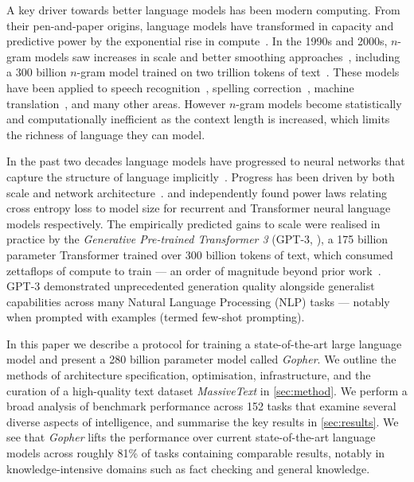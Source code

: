 \documentclass[11pt, a4paper, logo, internal, copyright, nonumbering]{deepmind}
\newcommand{\massivetext}{\textit{MassiveText}\xspace}
\newcommand{\gopher}{\textit{Gopher}\xspace}
\begin{document}
A key driver towards better language models has been modern computing. From their pen-and-paper origins, language models have transformed in capacity and predictive power by the exponential rise in compute~\citep{moore1965cramming}. In the 1990s and 2000s, $n$-gram models saw increases in scale and better smoothing approaches~\citep{ney1994structuring}, including a 300 billion $n$-gram model trained on two trillion tokens of text~\citep{brants2007large}.  These models have been applied to speech recognition~\citep{jelinek1997statistical}, spelling correction~\citep{brill2000improved}, machine translation~\citep{brown1990statistical}, and many other areas. However $n$-gram models become statistically and computationally inefficient as the context length is increased, which limits the richness of language they can model.

In the past two decades language models have progressed to neural networks that capture the structure of language implicitly~\citep{bengio2003neural, mikolov2010recurrent, graves2013generating, jozefowicz2016exploring, radford2019language}.
Progress has been driven by both scale and network architecture~\citep{hochreiter1997long,bahdanau2014neural,vaswani2017attention}.
\citet{rosenfeld2020a} and \citet{kaplan2020scaling} independently found power laws relating cross entropy loss to model size for recurrent and Transformer neural language models respectively.  The empirically predicted gains to scale were realised in practice by the \textit{Generative Pre-trained Transformer 3} (GPT-3, \citet{gpt3}), a 175 billion parameter Transformer trained over 300 billion tokens of text, which consumed zettaflops of compute to train --- an order of magnitude beyond prior work~\citep{rosset2020turing}. GPT-3 demonstrated unprecedented generation quality alongside generalist capabilities across many Natural Language Processing (NLP) tasks --- notably when prompted with examples (termed few-shot prompting).

In this paper we describe a protocol for training a state-of-the-art large language model and present a 280 billion parameter model called \gopher. We outline the methods of architecture specification, optimisation, infrastructure, and the curation of a high-quality text dataset \massivetext in \autoref{sec:method}. We perform a broad analysis of benchmark performance across 152 tasks that examine several diverse aspects of intelligence, and summarise the key results in \autoref{sec:results}. We see that \gopher lifts the performance over current state-of-the-art language models across roughly 81\% of tasks containing comparable results, notably in knowledge-intensive domains such as fact checking and general knowledge. 
\end{document}
